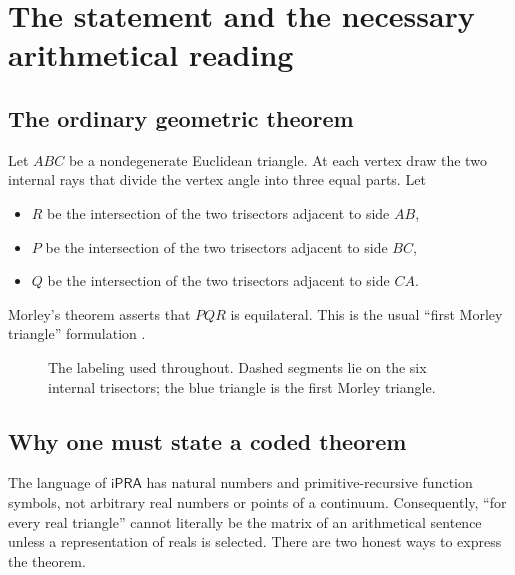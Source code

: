 \documentclass[11pt]{article}
\theoremstyle{definition}
\newcommand{\iPRA}{\mathsf{iPRA}}
\begin{document}
\tableofcontents

\section{The statement and the necessary arithmetical reading}

\subsection{The ordinary geometric theorem}
Let $ABC$ be a nondegenerate Euclidean triangle.  At each vertex draw the two
internal rays that divide the vertex angle into three equal parts.  Let
\begin{itemize}[nosep]
\item $R$ be the intersection of the two trisectors adjacent to side $AB$,
\item $P$ be the intersection of the two trisectors adjacent to side $BC$,
\item $Q$ be the intersection of the two trisectors adjacent to side $CA$.
\end{itemize}
Morley's theorem asserts that $PQR$ is equilateral.  This is the usual ``first
Morley triangle'' formulation \cite{MorleyWiki,Bollobas}.

\begin{figure}[ht]
\centering
{}
\caption{The labeling used throughout.  Dashed segments lie on the six internal
trisectors; the blue triangle is the first Morley triangle.}
\label{fig:morley}
\end{figure}

\subsection{Why one must state a coded theorem}
The language of $\iPRA$ has natural numbers and primitive-recursive function
symbols, not arbitrary real numbers or points of a continuum.  Consequently,
``for every real triangle'' cannot literally be the matrix of an arithmetical
sentence unless a representation of reals is selected.  There are two honest
ways to express the theorem.
\end{document}
